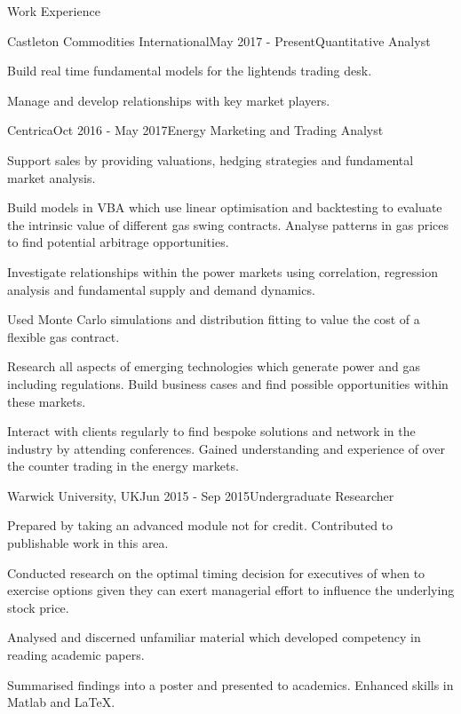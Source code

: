 \documentclass{resume} %
\begin{document}
\begin{rSection}{Work Experience}
	
	\begin{rSubsection}{Castleton Commodities International}{May 2017 - Present}{Quantitative Analyst}{}
		\item Build real time fundamental models for the lightends trading desk.
		\item Manage and develop relationships with key market players.		
	\end{rSubsection}	
	
	\begin{rSubsection}{Centrica}{Oct 2016 - May 2017}{Energy Marketing and Trading Analyst}{}
		\item Support sales by providing valuations, hedging strategies and fundamental market analysis.
		\item Build models in VBA which use linear optimisation and backtesting to evaluate the intrinsic value of different gas swing contracts. Analyse patterns in gas prices to find potential arbitrage opportunities.   
		\item Investigate relationships within the power markets using correlation, regression analysis and fundamental supply and demand dynamics.
		\item Used Monte Carlo simulations and distribution fitting to value the cost of a flexible gas contract.
		\item Research all aspects of emerging technologies which generate power and gas including regulations. Build business cases and find possible opportunities within these markets. 
		\item Interact with clients regularly to find bespoke solutions and network in the industry by attending conferences.  Gained understanding and experience of over the counter trading in the energy markets.	
		
	\end{rSubsection}
	

\begin{rSubsection}{Warwick University, UK}{Jun 2015 - Sep 2015}{Undergraduate Researcher}{}
\item Prepared by taking an advanced module not for credit. Contributed to publishable work in this area. 
\item Conducted research on the optimal timing decision for executives of when to exercise options given they can exert managerial effort to influence the underlying stock price.
\item Analysed and discerned unfamiliar material which developed competency in reading academic papers.
\item Summarised findings into a poster and presented to academics. Enhanced skills in Matlab and LaTeX.
\end{rSubsection}


\end{rSection}
\end{document}
